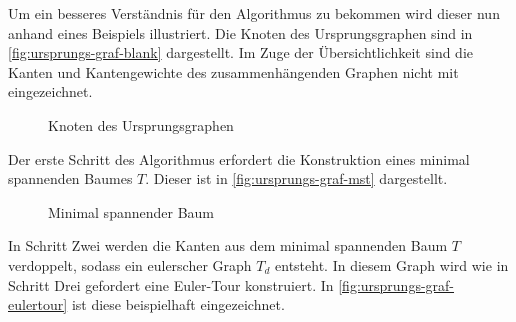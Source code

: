 \documentclass{article}
\begin{document}
Um ein besseres Verständnis für den Algorithmus zu bekommen wird dieser nun anhand eines Beispiels illustriert. Die Knoten des Ursprungsgraphen sind in \autoref{fig:ursprungs-graf-blank} dargestellt. Im Zuge der Übersichtlichkeit sind die Kanten und Kantengewichte des zusammenhängenden Graphen nicht mit eingezeichnet.

\begin{figure}[H]
\centering
{}
\caption{Knoten des Ursprungsgraphen}
\label{fig:ursprungs-graf-blank}
\end{figure}

Der erste Schritt des Algorithmus erfordert die Konstruktion eines minimal spannenden Baumes $T$. Dieser ist in \autoref{fig:ursprungs-graf-mst} dargestellt.

\begin{figure}[H]
\centering
{}
\caption{Minimal spannender Baum}
\label{fig:ursprungs-graf-mst}
\end{figure}

In Schritt Zwei werden die Kanten aus dem minimal spannenden Baum $T$ verdoppelt, sodass ein eulerscher Graph $T_d$ entsteht. In diesem Graph wird wie in Schritt Drei gefordert eine Euler-Tour konstruiert. In \autoref{fig:ursprungs-graf-eulertour} ist diese beispielhaft eingezeichnet.
\end{document}
